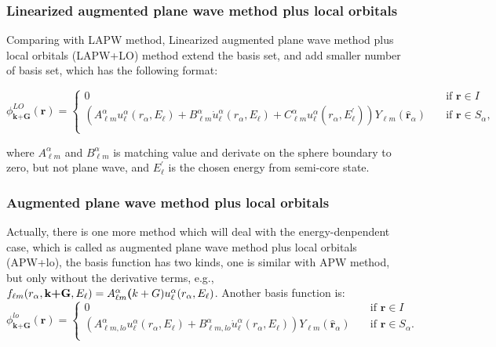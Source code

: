 \documentclass[a4paper, 12pt, titlepage,oneside,drop]{kthesis}
\begin{document}
\subsubsection{Linearized augmented plane wave method plus local orbitals}
Comparing with LAPW method, Linearized augmented plane wave method plus local orbitals (LAPW+LO) method extend the basis set, and add smaller number of basis set, which has the following format:


\begin{equation}\label{lap5}
\phi^{LO}_\textbf{k+G} (\textbf{r})= 
\begin{cases} 0 & \quad \mbox{if $\textbf{r} \in I $}
\\
(A _{{\ell}m}^{\alpha}  u_{{\ell}}^{\alpha}(r_{\alpha}, E_{\ell}) + B _{{\ell}m}^{\alpha}  \dot{u}_{{\ell}}^{\alpha}(r_{\alpha}, E_{\ell}) + C _{{\ell}m}^{\alpha}  u_{{\ell}}^{\alpha}(r_{\alpha}, E^{\prime}_{\ell})){Y_{{\ell}m}(\hat{\textbf{r}}_{\alpha})} & \quad \mbox{if $\textbf{r} \in S_\alpha, $}\\ 
\end{cases}
\end{equation}
 
where $A _{{\ell}m}^{\alpha}$ and $B _{{\ell}m}^{\alpha}$ is matching value and derivate on the sphere boundary to zero, but not plane wave, and $E^{\prime}_{\ell}$ is
the chosen energy from semi-core state.

\subsubsection{Augmented plane wave method plus local orbitals}

Actually, there is one more method which will deal with the energy-denpendent case, which is called as augmented plane wave method plus local orbitals (APW+lo), the 
basis function has two kinds, one is similar with APW method, but only without the derivative terms, e.g., $f_{{\ell}{m}} (r_{\alpha},\textbf{k+G} ,E_{\ell}) =  A _{{\ell}m}^{\alpha} \textbf(k+G) u_{{\ell}}^{\alpha}(r_{\alpha}, E_{\ell})$.
Another basis function is:
\begin{equation}\label{lap6}
\phi^{lo}_\textbf{k+G} (\textbf{r})= 
\begin{cases} 0 & \quad \mbox{if $\textbf{r} \in I $}
\\
(A _{{\ell}m,lo}^{\alpha}  u_{{\ell}}^{\alpha}(r_{\alpha}, E_{\ell}) + B _{{\ell}m,lo}^{\alpha}  \dot{u}_{{\ell}}^{\alpha}(r_{\alpha}, E_{\ell}) ){Y_{{\ell}m}(\hat{\textbf{r}}_{\alpha})} & \quad \mbox{if $\textbf{r} \in S_\alpha. $}\\ 
\end{cases}
\end{equation}
 
\end{document}
